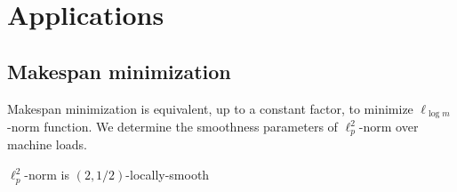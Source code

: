 
\section{Applications}

\subsection{Makespan minimization}


Makespan minimization is equivalent, up to a constant factor, to minimize $\ell_{\log m}$-norm function.
We determine the smoothness parameters of $\ell_{p}^{2}$-norm over machine loads.

\begin{lemma}
$\ell_{p}^{2}$-norm is $(2,1/2)$-locally-smooth
\end{lemma}
%
